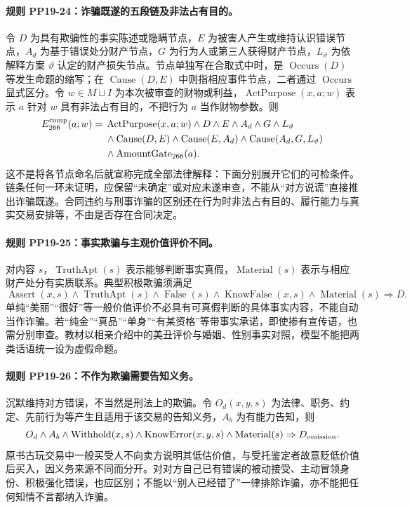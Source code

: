 \paragraph{规则 PP19-24：诈骗既遂的五段链及非法占有目的。}
\mbox{}\par
令 $D$ 为具有欺骗性的事实陈述或隐瞒节点，$E$ 为被害人产生或维持认识错误节点，$A_d$ 为基于错误处分财产节点，$G$ 为行为人或第三人获得财产节点，$L_\vartheta$ 为依解释方案 $\vartheta$ 认定的财产损失节点。节点单独写在合取式中时，是 $\operatorname{Occurs}(D)$ 等发生命题的缩写；在 $\operatorname{Cause}(D,E)$ 中则指相应事件节点，二者通过 $\operatorname{Occurs}$ 显式区分。令 $w\in M\sqcup I$ 为本次被审查的财物或利益，$\operatorname{ActPurpose}(x,a;w)$ 表示 $a$ 针对 $w$ 具有非法占有目的，不把行为 $a$ 当作财物参数。则
\[
\begin{aligned}
E_{266}^{\rm comp}(a;w)={}&\operatorname{ActPurpose}(x,a;w)
\land D\land E\land A_d\land G\land L_\vartheta\\
&\land\operatorname{Cause}(D,E)
\land\operatorname{Cause}(E,A_d)
\land\operatorname{Cause}(A_d,G,L_\vartheta)\\
&\land\operatorname{AmountGate}_{266}(a).
\end{aligned}
\]
这不是将各节点命名后就宣称完成全部法律解释：下面分别展开它们的可检条件。链条任何一环未证明，应保留“未确定”或对应未遂审查，不能从“对方说谎”直接推出诈骗既遂。合同违约与刑事诈骗的区别还在行为时非法占有目的、履行能力与真实交易安排等，不由是否存在合同决定。

\paragraph{规则 PP19-25：事实欺骗与主观价值评价不同。}
\mbox{}\par
对内容 $s$，$\operatorname{TruthApt}(s)$ 表示能够判断事实真假，$\operatorname{Material}(s)$ 表示与相应财产处分有实质联系。典型积极欺骗须满足
\[
\operatorname{Assert}(x,s)\land\operatorname{TruthApt}(s)
\land\operatorname{False}(s)\land\operatorname{KnowFalse}(x,s)
\land\operatorname{Material}(s)\Rightarrow D.
\]
单纯“美丽”“很好”等一般价值评价不必具有可真假判断的具体事实内容，不能自动当作诈骗。若“纯金”“真品”“单身”“有某资格”等带事实承诺，即使掺有宣传语，也需分别审查。教材以相亲介绍中的美丑评价与婚姻、性别事实对照，模型不能把两类话语统一设为虚假命题。

\paragraph{规则 PP19-26：不作为欺骗需要告知义务。}
\mbox{}\par
沉默维持对方错误，不当然是刑法上的欺骗。令 $O_d(x,y,s)$ 为法律、职务、约定、先前行为等产生且适用于该交易的告知义务，$A_b$ 为有能力告知，则
\[
O_d\land A_b\land\operatorname{Withhold}(x,s)
\land\operatorname{KnowError}(x,y,s)
\land\operatorname{Material}(s)
\Rightarrow D_{\rm omission}.
\]
原书古玩交易中一般买受人不向卖方说明其低估价值，与受托鉴定者故意贬低价值后买入，因义务来源不同而分开。对对方自己已有错误的被动接受、主动冒领身份、积极强化错误，也应区别；不能以“别人已经错了”一律排除诈骗，亦不能把任何知情不言都纳入诈骗。

